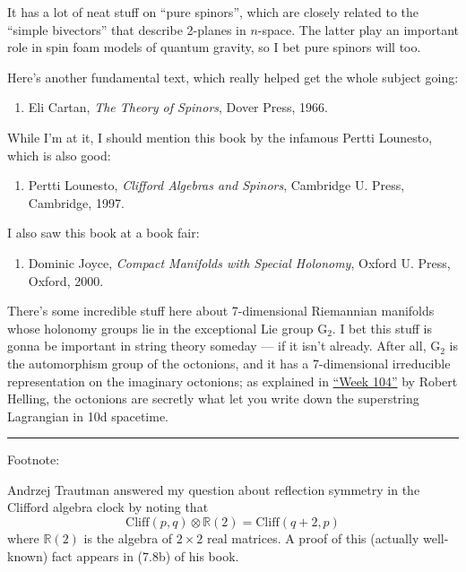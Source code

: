 \documentclass{article}
\def\tightlist{}
\begin{document}
It has a lot of neat stuff on ``pure spinors'', which are closely
related to the ``simple bivectors'' that describe 2-planes in
\(n\)-space. The latter play an important role in spin foam models of
quantum gravity, so I bet pure spinors will too.

Here's another fundamental text, which really helped get the whole
subject going:

\begin{enumerate}
\def\labelenumi{\arabic{enumi})}
\setcounter{enumi}{15}
\tightlist
\item
  Eli Cartan, \emph{The Theory of Spinors}, Dover Press, 1966.
\end{enumerate}

While I'm at it, I should mention this book by the infamous Pertti
Lounesto, which is also good:

\begin{enumerate}
\def\labelenumi{\arabic{enumi})}
\setcounter{enumi}{16}
\tightlist
\item
  Pertti Lounesto, \emph{Clifford Algebras and Spinors}, Cambridge U.
  Press, Cambridge, 1997.
\end{enumerate}

I also saw this book at a book fair:

\begin{enumerate}
\def\labelenumi{\arabic{enumi})}
\setcounter{enumi}{17}
\tightlist
\item
  Dominic Joyce, \emph{Compact Manifolds with Special Holonomy}, Oxford
  U. Press, Oxford, 2000.
\end{enumerate}

There's some incredible stuff here about 7-dimensional Riemannian
manifolds whose holonomy groups lie in the exceptional Lie group
\(\mathrm{G}_2\). I bet this stuff is gonna be important in string
theory someday --- if it isn't already. After all, \(\mathrm{G}_2\) is
the automorphism group of the octonions, and it has a 7-dimensional
irreducible representation on the imaginary octonions; as explained in
\protect\hyperlink{week104}{``Week 104''} by Robert Helling, the
octonions are secretly what let you write down the superstring
Lagrangian in 10d spacetime.

\begin{center}\rule{0.5\linewidth}{0.5pt}\end{center}

Footnote:

Andrzej Trautman answered my question about reflection symmetry in the
Clifford algebra clock by noting that
\[\mathrm{Cliff}(p,q) \otimes \mathbb{R}(2) = \mathrm{Cliff}(q+2,p)\]
where \(\mathbb{R}(2)\) is the algebra of \(2\times2\) real matrices. A
proof of this (actually well-known) fact appears in (7.8b) of his book.
\end{document}
